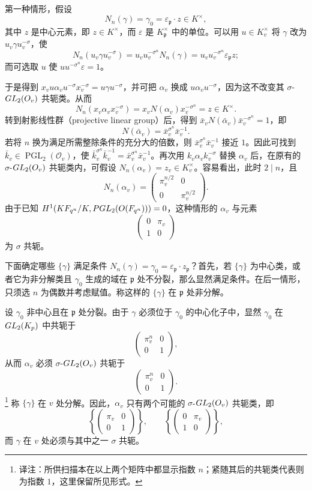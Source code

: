 第一种情形，假设
\[
N_n(\gamma)=\gamma_0=\varepsilon_{\mathfrak p}\cdot z\in K^\times,
\]
其中 $z$ 是中心元素，即 $z\in K^\times$，而 $\varepsilon$ 是 $K_{\mathfrak p}^\times$ 中的单位。可以用 $u\in K_v^\times$ 将 $\gamma$ 改为 $u_v\gamma u_v^{-\sigma}$，使
\[
N_n(u_v\gamma u_v^{-\sigma})
=u_vu_v^{-\sigma^n}N_n(\gamma)
=u_vu_v^{-\sigma^n}\varepsilon_{\mathfrak p}z;
\]
而可选取 $u$ 使 $uu^{-\sigma^n}\varepsilon=1$。

于是得到
$x_vu\alpha_vu^{-\sigma}x_v^{-\sigma}=u\gamma u^{-\sigma}$，并可把
$\alpha_v$ 换成 $u\alpha_vu^{-\sigma}$，因为这不改变其 $\sigma$-$GL_2(O_v)$ 共轭类。从而
\[
N_n(x_v\alpha_vx_v^{-\sigma})
=x_vN(\alpha_v)x_v^{-\sigma^n}=z\in K^\times.
\]
转到射影线性群（projective linear group）后，得到
$\bar x_vN(\bar\alpha_v)\bar x_v^{-\sigma^n}=1$，即
\[
N(\bar\alpha_v)=\bar x_v^{\sigma^n}\bar x_v^{-1}.
\]
若将 $n$ 换为满足所需整除条件的充分大的倍数，则
$\bar x_v^{\sigma^n}\bar x_v^{-1}$ 接近 $1$。因此可找到
$\bar k_v\in\operatorname{PGL}_2(\mathcal O_v)$，使
$\bar k_v^{\sigma^n}\bar k_v^{-1}=\bar x_v^{\sigma^n}\bar x_v^{-1}$。再次用
$k_v\alpha_vk_v^{-\sigma}$ 替换 $\alpha_v$ 后，在原有的
$\sigma$-$GL_2(O_v)$ 共轭类内，可假设
$N_n(\alpha_v)=z_v\in K_v^\times$。容易看出，此时 $2\mid n$，且
\[
N_n(\alpha_v)=\begin{pmatrix}\pi_v^{n/2}&0\\0&\pi_v^{n/2}\end{pmatrix}.
\]
由于已知
$H^1(KF_{q^n}/K,PGL_2(O(F_{q^n})))=0$，这种情形的 $\alpha_v$ 与元素
\[
\begin{pmatrix}0&\pi_v\\1&0\end{pmatrix}
\]
为 $\sigma$ 共轭。

下面确定哪些 $\{\gamma\}$ 满足条件
$N_n(\gamma)=\gamma_0=\varepsilon_{\mathfrak p}\cdot z_{\mathfrak p}$？首先，若 $\{\gamma\}$ 为中心类，或者它为非分解类且 $\gamma_0$ 生成的域在 $\mathfrak p$ 处不分裂，那么显然满足条件。在后一情形，只须选 $n$ 为偶数并考虑赋值。称这样的 $\{\gamma\}$ 在 $\mathfrak p$ 处非分解。

设 $\gamma_0$ 非中心且在 $\mathfrak p$ 处分裂。由于 $\gamma$ 必须位于 $\gamma_0$ 的中心化子中，显然 $\gamma_0$ 在 $GL_2(K_{p})$ 中共轭于
\[
\begin{pmatrix}\pi_v^n&0\\0&1\end{pmatrix},
\]
从而 $\alpha_v$ 必须 $\sigma$-$GL_2(O_v)$ 共轭于
\[
\begin{pmatrix}\pi_v^n&0\\0&1\end{pmatrix}.
\]
\footnote{译注：所供扫描本在以上两个矩阵中都显示指数 $n$；紧随其后的共轭类代表则为指数 $1$，这里保留所见形式。}
称 $\{\gamma\}$ 在 $v$ 处分解。因此，$\alpha_v$ 只有两个可能的
$\sigma$-$GL_2(O_v)$ 共轭类，即
\[
\left\{\begin{pmatrix}\pi_v&0\\0&1\end{pmatrix}\right\},\qquad
\left\{\begin{pmatrix}0&\pi_v\\1&0\end{pmatrix}\right\},
\]
而 $\gamma$ 在 $v$ 处必须与其中之一 $\sigma$ 共轭。
